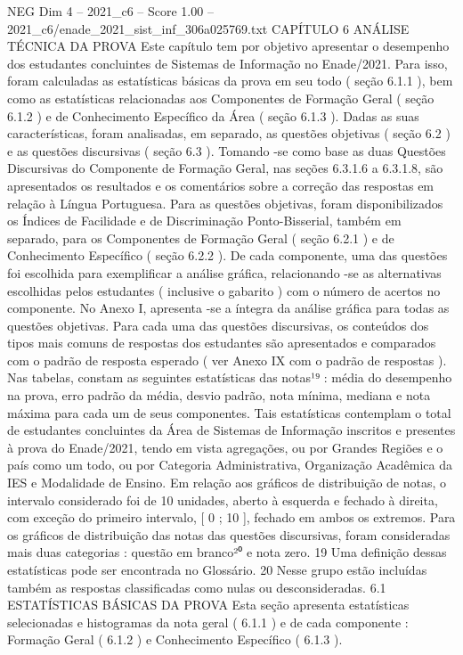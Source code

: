 \begin{textsample}{NEG Dim 4 – 2021\_c6 – Score 1.00 – 2021\_c6/enade\_2021\_sist\_inf\_306a025769.txt}  \label{ex:f4_neg_295}
CAPÍTULO 6 ANÁLISE TÉCNICA DA PROVA Este capítulo tem por objetivo apresentar o desempenho dos estudantes concluintes de Sistemas de Informação no Enade/2021.
Para isso, foram calculadas as estatísticas básicas da prova em seu todo ( seção 6.1.1 ), bem como as estatísticas relacionadas aos Componentes de Formação Geral ( seção 6.1.2 ) e de Conhecimento Específico da Área ( seção 6.1.3 ).
Dadas as suas características, foram analisadas, em separado, as questões objetivas ( seção 6.2 ) e as questões discursivas ( seção 6.3 ).
Tomando -se como base as duas Questões Discursivas do Componente de Formação Geral, nas seções 6.3.1.6 a 6.3.1.8, são apresentados os resultados e os comentários sobre a correção das respostas em relação à Língua Portuguesa.
Para as questões objetivas, foram disponibilizados os Índices de Facilidade e de Discriminação Ponto-Bisserial, também em separado, para os Componentes de Formação Geral ( seção 6.2.1 ) e de Conhecimento Específico ( seção 6.2.2 ).
De cada componente, uma das questões foi escolhida para exemplificar a análise gráfica, relacionando -se as alternativas escolhidas pelos estudantes ( inclusive o gabarito ) com o número de acertos no componente.
No Anexo I, apresenta -se a íntegra da análise gráfica para todas as questões objetivas.
Para cada uma das questões discursivas, os conteúdos dos tipos mais comuns de respostas dos estudantes são apresentados e comparados com o padrão de resposta esperado ( ver Anexo IX com o padrão de respostas ).
Nas tabelas, constam as seguintes estatísticas das notas¹⁹ : média do desempenho na prova, erro padrão da média, desvio padrão, nota mínima, mediana e nota máxima para cada um de seus componentes.
Tais estatísticas contemplam o total de estudantes concluintes da Área de Sistemas de Informação inscritos e presentes à prova do Enade/2021, tendo em vista agregações, ou por Grandes Regiões e o país como um todo, ou por Categoria Administrativa, Organização Acadêmica da IES e Modalidade de Ensino.
Em relação aos gráficos de distribuição de notas, o intervalo considerado foi de 10 unidades, aberto à esquerda e fechado à direita, com exceção do primeiro intervalo, [ 0 ; 10 ], fechado em ambos os extremos.
Para os gráficos de distribuição das notas das questões discursivas, foram consideradas mais duas categorias : questão em branco²⁰ e nota zero. 19 Uma definição dessas estatísticas pode ser encontrada no Glossário. 20 Nesse grupo estão incluídas também as respostas classificadas como nulas ou desconsideradas. 6.1 ESTATÍSTICAS BÁSICAS DA PROVA Esta seção apresenta estatísticas selecionadas e histogramas da nota geral ( 6.1.1 ) e de cada componente : Formação Geral ( 6.1.2 ) e Conhecimento Específico ( 6.1.3 ).

\end{textsample}
